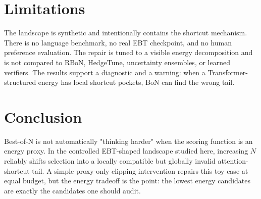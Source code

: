 \documentclass{article}
\begin{document}
\section{Limitations}

The landscape is synthetic and intentionally contains the shortcut mechanism.
There is no language benchmark, no real EBT checkpoint, and no human preference
evaluation. The repair is tuned to a visible energy decomposition and is not
compared to RBoN, HedgeTune, uncertainty ensembles, or learned verifiers. The
results support a diagnostic and a warning: when a Transformer-structured energy
has local shortcut pockets, BoN can find the wrong tail.

\section{Conclusion}

Best-of-N is not automatically "thinking harder" when the scoring function is an
energy proxy. In the controlled EBT-shaped landscape studied here, increasing
$N$ reliably shifts selection into a locally compatible but globally invalid
attention-shortcut tail. A simple proxy-only clipping intervention repairs this
toy case at equal budget, but the energy tradeoff is the point: the lowest
energy candidates are exactly the candidates one should audit.



\end{document}
